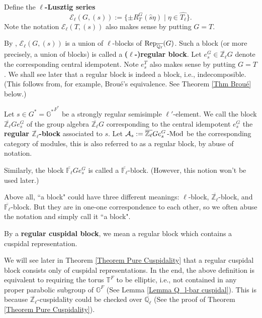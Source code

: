 	Define the \textbf{$\ell$-Lusztig series} 
	$$\mathcal{E}_\ell(G, (s)):=\{\pm R_T^G(\hat{s}\eta)\;|\; \eta \in \widehat{T_\ell}\}.$$ Note the notation $\mathcal{E}_\ell(T, (s))$ also makes sense by putting $G=T$.
	
	By \cite{michel1989bloc}, $\mathcal{E}_\ell(G, (s))$ is a union of $\ell$-blocks of $\operatorname{\operatorname{Rep}}_{\overline{\mathbb{Q}_\ell}}(G)$. Such a block (or more precisely, a union of blocks) is called a \textbf{($\ell$-)regular block}. Let $e_s^G \in \overline{\mathbb{Z}_\ell}G$ denote the corresponding central idempotent. Note $e_s^T$ also makes sense by putting $G=T$. We shall see later that a regular block is indeed a block, i.e., indecomposible. (This follows from, for example, Broué's equivalence. See Theorem \ref{Thm Broué} below.)
	
	\begin{definition}\label{Def Regular Block}
		Let $s \in G^*={\mathbb{G}^*}^{F^*}$ be a strongly regular semisimple $\ell'$-element.
		We call the block $\overline{\mathbb{Z}_\ell}Ge_s^G$ of the group algebra $\overline{\mathbb{Z}_\ell}G$ corresponding to the central idempotent $e_s^G$ the \textbf{regular $\overline{\mathbb{Z}_\ell}$-block} associated to $s$. Let $\mathcal{A}_s:=\overline{\mathbb{Z}_\ell}Ge_s^G\operatorname{-Mod}$ be the corresponding category of modules, this is also referred to as a regular block, by abuse of notation.
		
		Similarly, the block $\overline{\mathbb{F}_\ell}Ge_s^G$ is called a $\overline{\mathbb{F}_{\ell}}$-block. (However, this notion won't be used later.)
	
	\end{definition}
	
	\begin{remark}
		Above all, ``a block" could have three different meanings: $\ell$-block, $\overline{\mathbb{Z}_{\ell}}$-block, and $\overline{\mathbb{F}_{\ell}}$-block. But they are in one-one correspondence to each other, so we often abuse the notation and simply call it ``a block".
	\end{remark}
	
	\begin{definition}
		By a \textbf{regular cuspidal block}, we mean a regular block which contains a cuspidal representation.
	\end{definition}
	
	\begin{remark}
		We will see later in Theorem \ref{Theorem Pure Cuspidality} that a regular cuspidal block consists only of cuspidal representations. In the end, the above definition is equivalent to requiring the torus $\mathbb{T}^F$ to be elliptic, i.e., not contained in any proper parabolic subgroup of $\mathbb{G}^F$ (See Lemma \ref{Lemma Q_l-bar cuspidal}). This is because $\overline{\mathbb{Z}_{\ell}}$-cuspidality could be checked over $\overline{\mathbb{Q}_{\ell}}$ (See the proof of Theorem \ref{Theorem Pure Cuspidality}).
	\end{remark}
	
